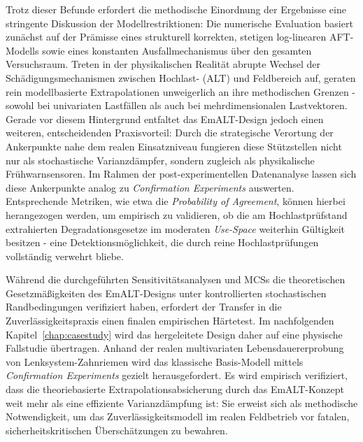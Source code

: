 Trotz dieser Befunde erfordert die methodische Einordnung der Ergebnisse eine stringente Diskussion der Modellrestriktionen:
Die numerische Evaluation basiert zunächst auf der Prämisse eines strukturell korrekten, stetigen log-linearen \ac{AFT}-Modells sowie eines konstanten Ausfallmechanismus über den gesamten Versuchsraum.
Treten in der physikalischen Realität abrupte Wechsel der Schädigungsmechanismen zwischen Hochlast- (\ac{ALT}) und Feldbereich auf, geraten rein modellbasierte Extrapolationen unweigerlich an ihre methodischen Grenzen - sowohl bei univariaten Lastfällen als auch bei mehrdimensionalen Lastvektoren.
Gerade vor diesem Hintergrund entfaltet das \ac{EmALT}-Design jedoch einen weiteren, entscheidenden Praxisvorteil:
Durch die strategische Verortung der Ankerpunkte nahe dem realen Einsatzniveau fungieren diese Stützstellen nicht nur als stochastische Varianzdämpfer, sondern zugleich als physikalische Frühwarnsensoren.
Im Rahmen der post-experimentellen Datenanalyse lassen sich diese Ankerpunkte analog zu \textit{Confirmation Experiments} \cite{Stevens.2019} auswerten.
Entsprechende Metriken, wie etwa die \textit{Probability of Agreement}, können hierbei herangezogen werden, um empirisch zu validieren, ob die am Hochlastprüfstand extrahierten Degradationsgesetze im moderaten \textit{Use-Space} weiterhin Gültigkeit besitzen - eine Detektionsmöglichkeit, die durch reine Hochlastprüfungen vollständig verwehrt bliebe.

Während die durchgeführten Sensitivitätsanalysen und \acp{MCS} die theoretischen Gesetzmäßigkeiten des \ac{EmALT}-Designs unter kontrollierten stochastischen Randbedingungen verifiziert haben, erfordert der Transfer in die Zuverlässigkeitspraxis einen finalen empirischen Härtetest.
Im nachfolgenden Kapitel~\ref{chap:casestudy} wird das hergeleitete Design daher auf eine physische Fallstudie übertragen.
Anhand der realen multivariaten Lebensdauererprobung von Lenksystem-Zahnriemen wird das klassische Basis-Modell mittels \textit{Confirmation Experiments} gezielt herausgefordert.
Es wird empirisch verifiziert, dass die theoriebasierte Extrapolationsabsicherung durch das \ac{EmALT}-Konzept weit mehr als eine effiziente Varianzdämpfung ist: Sie erweist sich als methodische Notwendigkeit, um das Zuverlässigkeitsmodell im realen Feldbetrieb vor fatalen, sicherheitskritischen Überschätzungen zu bewahren.
